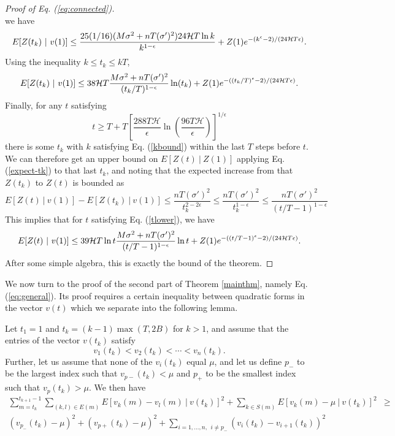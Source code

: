 \documentclass[final]{siamltex}
\begin{document}
\begin{proof}[Proof of Eq. (\ref{eq:connected})]
\begin{equation}
\end{equation} we have
\[ E [ Z(t_k) ~|~ v(1) ] \leq \frac{25 (1/16)  (M\sigma^2 + nT(\sigma')^2)24 {\cal H} T \ln k}{k^{1 - \epsilon}}  + Z(1) e^{-(k^\epsilon - 2)/(24 \mathcal{H} T\epsilon)}. \]  Using the inequality $k \leq t_k \leq kT$, 
\begin{equation} \label{expect-tk} E [ Z(t_k) ~|~ v(1) ] \leq 38 {\cal H} T  \frac{   M \sigma^2 + n T(\sigma')^2}{(t_k/T)^{1 - \epsilon}} \ln (t_k) + Z(1) e^{-((t_k/T)^\epsilon - 2)/(24 \mathcal{H} T\epsilon)}.
\end{equation} 
Finally, for any $t$ satisfying  \begin{equation} \label{tlower} t \geq T +  T \left[ \frac{288 T  \mathcal{H} }{\epsilon} \ln \left( \frac{96 T \mathcal{H} }{\epsilon} \right) \right]^{1/\epsilon} \end{equation} there is some $t_k$ with $k$ satisfying Eq. (\ref{kbound}) within the last $T$ steps before $t$. We can therefore get an upper bound
on $E[Z(t) ~|~ Z(1)]$ applying Eq. (\ref{expect-tk}) to that last $t_k$, and noting that the expected increase from that $Z(t_k)$ to $Z(t)$ is bounded as 
\[ E[Z(t) ~|~ v(1)] - E[Z(t_k) ~|~ v(1)] \leq \frac{nT (\sigma')^2}{t_k^{2-2\epsilon}} \leq \frac{n T (\sigma')^2}{t_k^{1-\epsilon}}  \leq \frac{n T (\sigma')^2}{(t/T-1)^{1-\epsilon}} \]  This implies that for $t$ satisfying Eq. (\ref{tlower}), we have
\[ E[ Z(t) ~|~ v(1) ]  \leq  39 {\cal H} T \ln t\frac{M \sigma^2 + n T(\sigma')^2}{(t/T-1)^{1 - \epsilon}} \ln t + Z(1) e^{-((t/T-1)^\epsilon - 2)/(24 \mathcal{H} T\epsilon)}. \]  After some simple algebra, this is exactly the bound of the theorem. 
 \end{proof}
 
\bigskip
 

 We now turn to the proof of the second part of Theorem \ref{mainthm}, namely Eq. (\ref{eq:general}). Its proof requires a certain inequality between quadratic forms in the vector $v(t)$ which we 
 separate into the following lemma. 
 
 \bigskip
 
 \begin{lemma} Let $t_1 = 1$ and $t_k = (k-1) \max(T,2B)$ for $k > 1$, and assume that the entries of the vector $v(t_k)$ satisfy  \[ v_1(t_k) < v_2(t_k) < \cdots < v_n(t_k). \]  Further, let us assume that none of the $v_i(t_k)$ equal $\mu$, and let us define $p_-$ to be the largest index such that $v_{p-}(t_k)<\mu$ and $p_+$ to be the smallest index such that
 $v_p(t_k)> \mu$.  We then have \begin{eqnarray} \sum_{m=t_k}^{t_{k+1}-1} \sum_{(k,l) \in E(m)} E[v_k(m)-v_l(m) ~|~ v(t_k)]^2 +  \sum_{k \in S(m)} E[v_k(m) - \mu ~|~ v(t_k)]^2  & \geq & \nonumber\\  (v_{p_-}(t_k) - \mu)^2 + (v_{p+}(t_k) - \mu)^2 +  \sum_{i=1, \ldots, n, ~~ i \neq p_{-}}  (v_i(t_k) - v_{i+1}(t_k))^2   &&  \label{eq:quantdecbound}  \end{eqnarray} \label{lemma:quantdecbound} 
 \end{lemma} 
 
\end{document}
